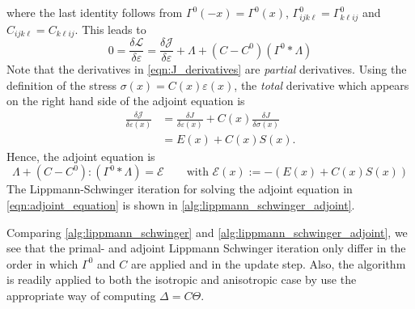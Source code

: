 \documentclass[11pt]{article}
\begin{document}
where the last identity follows from $\Gamma^0(-x) = \Gamma^0(x)$, $\Gamma^0_{ijk\ell} = \Gamma^0_{k\ell ij}$ and $C_{ijk\ell}=C_{k\ell ij}$. This leads to
\begin{equation}
0 = \frac{\delta\mathcal{L}}{\delta\varepsilon} = \frac{\delta \mathcal{J}}{\delta \varepsilon} + \Lambda + \left(C-C^0\right) \left(\Gamma^0 * \Lambda\right)
\end{equation}
Note that the derivatives in \eqref{eqn:J_derivatives} are \textit{partial} derivatives. Using the definition of the stress $\sigma(x) = C(x)\varepsilon(x)$, the \textit{total} derivative which appears on the right hand side of the adjoint equation is 
\begin{equation}
    \begin{aligned}
\frac{\delta \mathcal{J}}{\delta \varepsilon(x)} &= \frac{\delta J}{\delta \varepsilon(x)}+ C(x)\frac{\delta J}{\delta \sigma(x)}\\
&=E(x)+ C(x)S(x).
    \end{aligned}
\end{equation}
Hence, the adjoint equation is
\begin{equation}
    \Lambda + \left(C-C^0\right) : \left(\Gamma^0 * \Lambda\right) = \mathcal{E}\qquad\text{with $\mathcal{E}(x):= -\left(E(x)+ C(x)S(x)\right)$}\label{eqn:adjoint_equation}
\end{equation}
The Lippmann-Schwinger iteration for solving the adjoint equation in \eqref{eqn:adjoint_equation} is shown in \cref{alg:lippmann_schwinger_adjoint}.
\begin{algorithm}
    \caption{Adjoint Lippmann Schwinger iteration (simplest form)}
    \label{alg:lippmann_schwinger_adjoint}
\begin{algorithmic}[1]
    \EndFor
\State{\Return $\Lambda$}
\end{algorithmic}
\end{algorithm}
Comparing \cref{alg:lippmann_schwinger} and \cref{alg:lippmann_schwinger_adjoint}, we see that the primal- and adjoint Lippmann Schwinger iteration only differ in the order in which $\Gamma^0$ and $C$ are applied and in the update step. Also, the algorithm is readily applied to both the isotropic and anisotropic case by use the appropriate way of computing $\Delta = C\Theta$.
\end{document}
